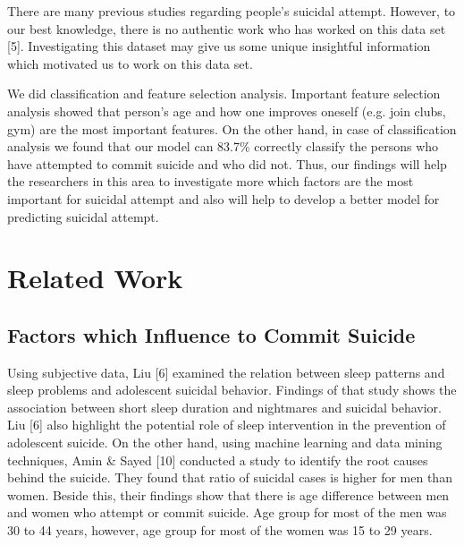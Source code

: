 \documentclass[conference]{IEEEtran}
\begin{document}
   There are many previous studies regarding people’s suicidal attempt. However, to our best knowledge, there is no authentic work who has worked on this data set [5]. Investigating this dataset may give us some unique insightful information which motivated us to work on this data set.

   We did classification and feature selection analysis. Important feature selection analysis showed that person’s age and how one improves oneself (e.g. join clubs, gym) are the most important features. On the other hand, in case of classification analysis we found that our model can 83.7\% correctly classify the persons who have attempted to commit suicide and who did not. Thus, our findings will help the researchers in this area to investigate more which factors are the most important for suicidal attempt and also will help to develop a better model for predicting suicidal attempt.

\section{Related Work}

\subsection{Factors which Influence to Commit Suicide}

Using subjective data, Liu [6] examined the relation between sleep patterns and sleep problems and adolescent suicidal behavior. Findings of that study shows the association between short sleep duration and nightmares and suicidal behavior. Liu [6] also highlight the potential role of sleep intervention in the prevention of adolescent suicide. On the other hand, using machine learning and data mining techniques, Amin \& Sayed [10] conducted a study to identify the root causes behind the suicide. They found that ratio of suicidal cases is higher for men than women. Beside this, their findings show that there is age difference between men and women who attempt or commit suicide. Age group for most of the men was 30 to 44 years, however, age group for most of the women was 15 to 29 years.  
\end{document}
